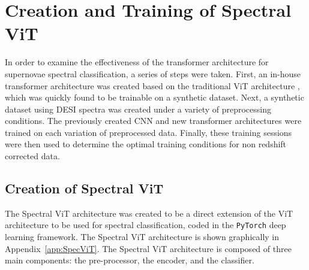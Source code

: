 

\chapter{Creation and Training of Spectral ViT}
\label{chap:methods}

In order to examine the effectiveness of the transformer architecture for supernovae
spectral classification, a series of steps were taken. First, an in-house transformer 
architecture was created based on the traditional ViT architecture \cite{dosovitskiy2020}, 
which was quickly found to be trainable on a synthetic dataset. Next, a synthetic dataset 
using DESI spectra was created under a variety of preprocessing conditions. The previously 
created CNN and new transformer architectures were trained on each variation of 
preprocessed data. Finally, these training sessions were then used to determine 
the optimal training conditions for non redshift corrected data. 
\section{Creation of Spectral ViT}\label{sec:SpecViT}
The Spectral ViT architecture was created to be a direct extension of the ViT architecture
\cite{dosovitskiy2020} to be used for spectral classification, coded in the \texttt{PyTorch}
deep learning framework. The Spectral ViT architecture is shown graphically in
Appendix~\ref{app:SpecViT}. The Spectral ViT architecture is
composed of three main components: the pre-processor, the encoder, and the classifier. 

